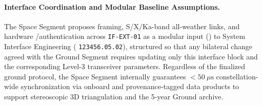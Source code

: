 \paragraph{Interface Coordination and Modular Baseline Assumptions.}
The Space Segment proposes  framing, S/X/Ka-band all-weather  links, and hardware /authentication across \texttt{IF-EXT-01} as a modular input () to System Interface Engineering ( \texttt{123456.05.02}), structured so that any bilateral change agreed with the Ground Segment requires updating only this interface block and the corresponding Level-3 transceiver parameters. Regardless of the finalized ground protocol, the Space Segment internally guarantees $< 50~\mu\mathrm{s}$ constellation-wide  synchronization via onboard  and provenance-tagged data products to support stereoscopic 3D triangulation and the 5-year Ground archive.
